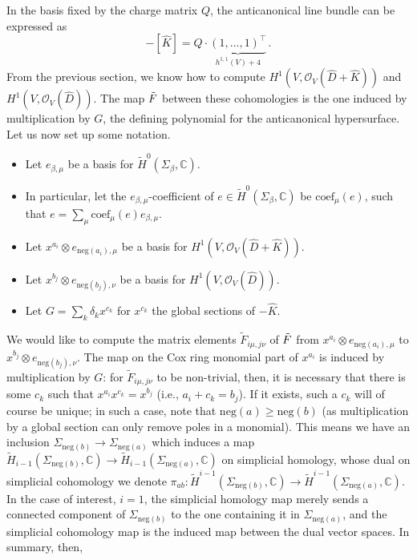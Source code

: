 \documentclass[11pt,dvipsnames]{article}
\theoremstyle{definition}
\newcommand{\cO}{\mathcal{O}}
\begin{document}
In the basis fixed by the charge matrix $Q$, the anticanonical line bundle can be expressed as
\begin{equation}
    -[\hat{K}] = Q \cdot \underbrace{(1, \dots, 1)^\intercal}_{h^{1,1}(V)+4}\,.
\end{equation}
From the previous section, we know how to compute $H^1(V,\cO_V(\hat{D}+\hat{K}))$ and $H^1(V,\cO_V(\hat{D}))$. The map $\Tilde{F}$ between these cohomologies is the one induced by multiplication by $G$, the defining polynomial for the anticanonical hypersurface. Let us now set up some notation.
\begin{itemize}
    \item Let $e_{\beta,\mu}$ be a basis for $\tilde{H}^{0}(\Sigma_\beta,\mathbb{C})$.
    \item In particular, let the $e_{\beta,\mu}$-coefficient of $e \in \tilde{H}^{0}(\Sigma_\beta,\mathbb{C})$ be $\mathrm{coef}_\mu(e)$, such that $e = \sum_\mu \mathrm{coef}_\mu(e) e_{\beta,\mu}$.
    \item Let $x^{a_i} \otimes e_{\mathrm{neg}(a_i),\mu}$ be a basis for $H^1(V,\cO_V(\hat{D}+\hat{K}))$.
    \item Let $x^{b_j} \otimes e_{\mathrm{neg}(b_j),\nu}$ be a basis for $H^1(V,\cO_V(\hat{D}))$.
    \item Let $G = \sum_k \delta_k x^{c_k}$ for $x^{c_k}$ the global sections of $-\hat{K}$.
\end{itemize}
We would like to compute the matrix elements $\tilde{F}_{i\mu, j\nu}$ of $\Tilde{F}$ from $x^{a_i} \otimes e_{\mathrm{neg}(a_i),\mu}$ to $x^{b_j} \otimes e_{\mathrm{neg}(b_j),\nu}$. The map on the Cox ring monomial part of $x^{a_i}$ is induced by multiplication by $G$: for $\tilde{F}_{i\mu, j\nu}$ to be non-trivial, then, it is necessary that there is some $c_k$ such that $x^{a_i}x^{c_k} = x^{b_j}$ (i.e., $a_i + c_k = b_j$). If it exists, such a $c_k$ will of course be unique; in such a case, note that $\mathrm{neg}(a) \geq \mathrm{neg}(b)$ (as multiplication by a global section can only remove poles in a monomial). This means we have an inclusion $\Sigma_{\mathrm{neg}(b)} \to \Sigma_{\mathrm{neg}(a)}$ which induces a map $\tilde{H}_{i-1}(\Sigma_{\mathrm{neg}(b)},\mathbb{C}) \to \tilde{H}_{i-1}(\Sigma_{\mathrm{neg}(a)},\mathbb{C})$ on simplicial homology, whose dual on simplicial cohomology we denote $\pi_{ab} : \tilde{H}^{i-1}(\Sigma_{\mathrm{neg}(b)},\mathbb{C}) \to \tilde{H}^{i-1}(\Sigma_{\mathrm{neg}(a)},\mathbb{C})$. In the case of interest, $i = 1$, the simplicial homology map merely sends a connected component of $\Sigma_{\mathrm{neg}(b)}$ to the one containing it in $\Sigma_{\mathrm{neg}(a)}$, and the simplicial cohomology map is the induced map between the dual vector spaces. In summary, then,
\end{document}
